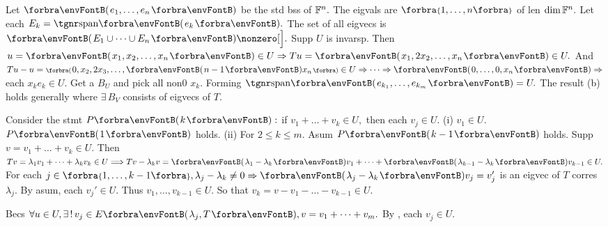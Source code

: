 Let $\Par{e_1,\dots,e_n}$ be the std bss of ${\mathbb{F}}^n.$ The eigvals are $\Bra{1,\dots,n}$ of len $\dim{\mathbb{F}}^n.$\parSol{}
Let each $E_k=\Span{e_k}.$ The set of all eigvecs is $\Par{E_1\cup\cdots\cup E_n}\nonzero[\Big].$\parSol{}
Supp $U$ is invarsp. Then $u=\Par{x_1,x_2,\dots,x_n}\in U\Rightarrow Tu=\Par{x_1,2x_2,\dots,x_n}\in U.$\parSol{}
And $Tu-u=\BigPar{0,x_2,2x_3,\dots,\Par{n-1}x_n}\in U\Rightarrow\cdots\Rightarrow\Par{0,\dots,0,x_n}\Rightarrow$ each $x_ke_k\in U.$\parSol{}
Get a $B_U$ and pick all non0 $x_k.$ Forming $\Span{e_{k_1},\dots,e_{k_m}}=U.$\PfEnd\vspace{2pt}
\AComm The result (b) holds generally where $\exists\,B_V$ consists of eigvecs of $T.$
\SepLine

Consider the stmt $P\Par{k}:$ if $v_1+\dots+v_k\in U,$ then each $v_j\in U.$\parSol{}
(i) $v_1\in U.$ $P\Par{1}$ holds. (ii) For $2\leqslant k\leqslant m.$ Asum $P\Par{k-1}$ holds. Supp $v=v_1+\dots+v_k\in U.$\parSol{}
Then $Tv=\lambda_1v_1+\dots+\lambda_k v_k\in U\Longrightarrow Tv-\lambda_k v=\Par{\lambda_1-\lambda_k}v_1+\dots+\Par{\lambda_{k-1}-\lambda_k}v_{k-1}\in U.$\parSol{}
For each $j\in\Bra{1,\dots,k-1},\lambda_j-\lambda_{k}\neq 0\Rightarrow\Par{\lambda_j-\lambda_k}v_j=v_j'$ is an eigvec of $T$ corres $\lambda_j.$\parSol{}
By asum, each $v_j'\in U.$ Thus $v_1,\dots,v_{k-1}\in U.$ So that $v_k=v-v_1-\dots-v_{k-1}\in U.$\PfEnd
\SepLine[0pt][\Blind{\BulletPointX} ]

Becs $\forall u\in U,\exists\,!\,v_j\in E\Par{\lambda_j,T},v=v_1+\dots+v_m.$ By , each $v_j\in U.$\PfEnd%
\SepLine

